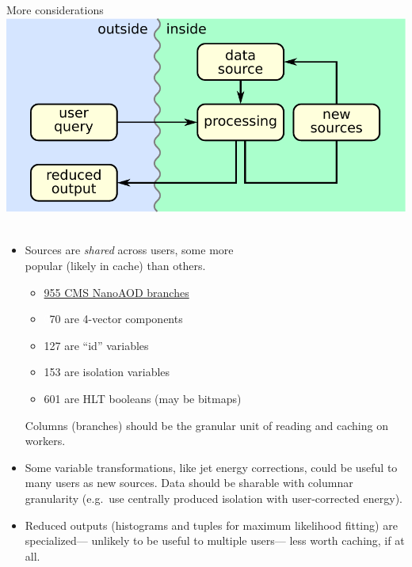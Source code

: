 \documentclass[aspectratio=169]{beamer}
\begin{document}
\begin{frame}{More considerations}
\vspace{0.25 cm}
\hfill \mbox{\includegraphics[height=3 cm]{basic-block-diagram.pdf} \hspace{-0.75 cm}}

\vspace{-3 cm}
\begin{itemize}\setlength{\itemsep}{0.5 cm}
\item<1-> Sources are {\it shared} across users, some more \\ popular (likely in cache) than others.

\vspace{0.1 cm}
\begin{itemize}
\item \underline{955 CMS NanoAOD branches}
\item \textcolor{white}{0}70 are 4-vector components
\item 127 are ``id'' variables
\item 153 are isolation variables
\item 601 are HLT booleans (may be bitmaps)
\end{itemize}

\vspace{0.1 cm}
\hspace{-0.5 cm}Columns (branches) should be the granular unit of reading and caching on workers.

\item<2-> Some variable transformations, like jet energy corrections, could be useful to many users as new sources. Data should be sharable with columnar granularity (e.g.\ use centrally produced isolation with user-corrected energy).

\item<3-> Reduced outputs (histograms and tuples for maximum likelihood fitting) are specialized--- unlikely to be useful to multiple users--- less worth caching, if at all.
\end{itemize}
\end{frame}
\end{document}
